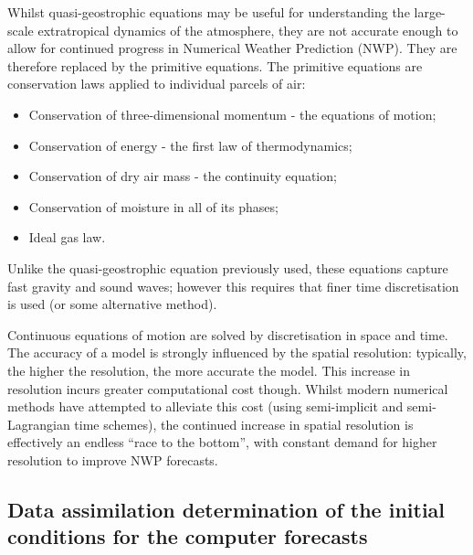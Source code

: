 Whilst quasi-geostrophic equations may be useful for understanding the large-scale extratropical dynamics of the atmosphere, they are not accurate enough to allow for continued progress in Numerical Weather Prediction (NWP).
They are therefore replaced by the primitive equations.
The primitive equations are conservation laws applied to individual parcels of air:
\begin{itemize}
\item Conservation of three-dimensional momentum - the equations of motion;
\item Conservation of energy - the first law of thermodynamics;
\item Conservation of dry air mass - the continuity equation;
\item Conservation of moisture in all of its phases;
\item Ideal gas law.
\end{itemize}
Unlike the quasi-geostrophic equation previously used, these equations capture fast gravity and sound waves; however this requires that finer time discretisation is used (or some alternative method).

Continuous equations of motion are solved by discretisation in space and time.
The accuracy of a model is strongly influenced by the spatial resolution: typically, the higher the resolution, the more accurate the model.
This increase in resolution incurs greater computational cost though.
Whilst modern numerical methods have attempted to alleviate this cost (using semi-implicit and semi-Lagrangian time schemes), the continued increase in spatial resolution is effectively an endless ``race to the bottom'', with constant demand for higher resolution to improve NWP forecasts.

\subsection{Data assimilation determination of the initial conditions for the computer forecasts}
\label{sub:historical_overview:assimilation}

